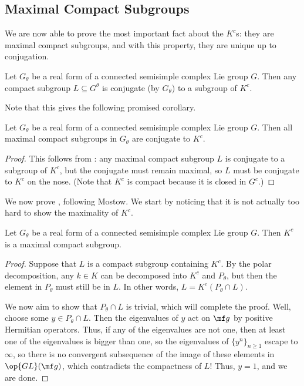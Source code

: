 \documentclass[../notes.tex]{subfiles}
\begin{document}
\subsection{Maximal Compact Subgroups}
We are now able to prove the most important fact about the $K^c$s: they are maximal compact subgroups, and with this property, they are unique up to conjugation.
\begin{theorem}[Cartan] \label{thm:cartan-compact}
	Let $G_\theta$ be a real form of a connected semisimple complex Lie group $G$. Then any compact subgroup $L\subseteq G^\theta$ is conjugate (by $G_\theta$) to a subgroup of $K^c$.
\end{theorem}
Note that this gives the following promised corollary.
\begin{corollary}
	Let $G_\theta$ be a real form of a connected semisimple complex Lie group $G$. Then all maximal compact subgroups in $G_\theta$ are conjugate to $K^c$.
\end{corollary}
\begin{proof}
	This follows from : any maximal compact subgroup $L$ is conjugate to a subgroup of $K^c$, but the conjugate must remain maximal, so $L$ must be conjugate to $K^c$ on the nose. (Note that $K^c$ is compact because it is closed in $G^c$.)
\end{proof}
We now prove , following Mostow. We start by noticing that it is not actually too hard to show the maximality of $K^c$.
\begin{theorem}
	Let $G_\theta$ be a real form of a connected semisimple complex Lie group $G$. Then $K^c$ is a maximal compact subgroup.
\end{theorem}
\begin{proof}
	Suppose that $L$ is a compact subgroup containing $K^c$. By the polar decomposition, any $k\in K$ can be decomposed into $K^c$ and $P_\theta$, but then the element in $P_\theta$ must still be in $L$. In other words, $L=K^c(P_\theta\cap L)$.

	We now aim to show that $P_\theta\cap L$ is trivial, which will complete the proof. Well, choose some $y\in P_\theta\cap L$. Then the eigenvalues of $y$ act on $\mf g$ by positive Hermitian operators. Thus, if any of the eigenvalues are not one, then at least one of the eigenvalues is bigger than one, so the eigenvalues of $\{y^n\}_{n\ge1}$ escape to $\infty$, so there is no convergent subsequence of the image of these elements in $\op{GL}(\mf g)$, which contradicts the compactness of $L$! Thus, $y=1$, and we are done.
\end{proof}
\end{document}
